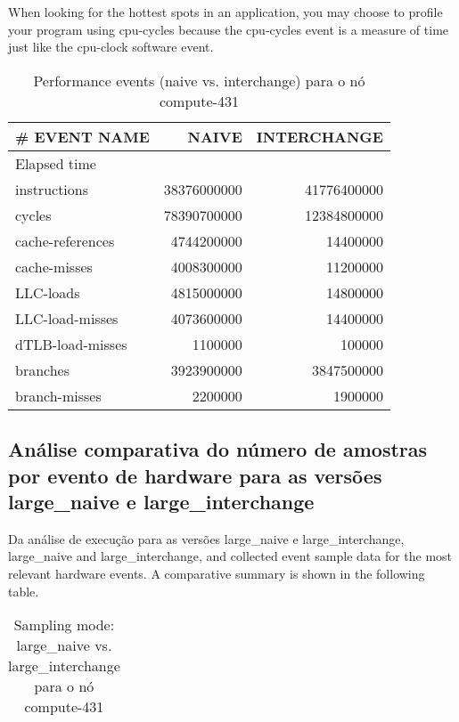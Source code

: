 \documentclass[conference,compsoc]{IEEEtran}
\begin{document}
\begin{itemize}
When looking for the hottest spots in an application, you may choose to profile your program using cpu-cycles because the cpu-cycles event is a measure of time just like the cpu-clock software event.


 \begin{table}[H]
  \caption{Performance events (naive vs. interchange) para o nó compute-431}
  \label{table:search_events}
  \centering
  \begin{tabular}{ | l | r | r |   }

  \hline
  \# EVENT NAME	 & NAIVE  & INTERCHANGE \\ \hline 
   Elapsed time & &  \\ \hline    
  instructions	& 38376000000 &  41776400000 \\ \hline    
cycles	& 78390700000 &  12384800000 \\ \hline    
cache-references	& 4744200000 &  14400000 \\ \hline    
cache-misses	&  4008300000 &  11200000 \\ \hline    
LLC-loads	& 4815000000  &  14800000 \\ \hline    
LLC-load-misses	& 4073600000 & 14400000  \\ \hline    
dTLB-load-misses & 1100000	& 100000  \\ \hline    
branches	& 3923900000 & 3847500000  \\ \hline    
branch-misses	&  2200000 &  1900000 \\ \hline    

  \end{tabular}
  \end{table}

\subsection{Análise comparativa do número de amostras por evento de hardware para as versões large\_naive e large\_interchange}

Da análise de execução para as versões large\_naive e large\_interchange, 
 large_naive and large_interchange, and collected event sample data for the most relevant hardware events. A comparative summary is shown in the following table.


 \begin{table}[H]
  \caption{Sampling mode: large\_naive vs. large\_interchange
 para o nó compute-431}
  \label{table:search_sampling}
  \centering
  \begin{tabular}{ | l | r | r |   }


\end{tabular}
\end{table}
\end{itemize}
\end{document}
